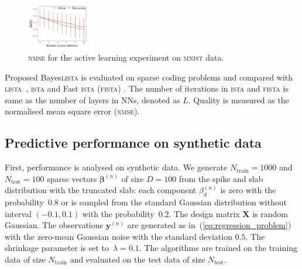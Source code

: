 \documentclass{article}
\begin{document}
    \begin{figure}[!t]
  \centering
  \includegraphics[width=0.24\textwidth]{graphics/active_mnist/nmse_validation}
  \caption{\textsc{nmse} for the active learning experiment on \textsc{mnist} data. }
  \label{fig:active_learning_mnist}
  \end{figure}

  Proposed Bayes\textsc{lista} is evaluated on sparse coding problems and compared with \textsc{lista}~\cite{gregor2010learning}, \textsc{ista} \cite{daubechies2004iterative} and Fast \textsc{ista} (\textsc{fista}) \cite{beck2009fast}. The number of iterations in \textsc{ista} and \textsc{fista} is same as the number of layers in NNs, denoted as $L$. Quality is measured as the normalised mean square error (\textsc{nmse}). %

  \subsection{Predictive performance on synthetic data}
  First, performance is analysed on synthetic data. We generate $N_\text{train}=1000$ and $N_{\text{test}} = 100$ sparse vectors $\boldsymbol\beta^{(n)}$ of size $D = 100$  from the spike and slab distribution with the truncated slab: each component $\beta^{(n)}_{d}$ is zero with the probability~$0.8$ or is sampled from the standard Gaussian distribution without interval $(-0.1, 0.1)$ with the probability~$0.2$. The design matrix $\mathbf{X}$ is random Gaussian.  The observations $\mathbf{y}^{(n)}$ are generated as in~(\ref{eq:regression_problem}) with the zero-mean Gaussian noise with the standard deviation $0.5$. The shrinkage parameter is set to~$\lambda = 0.1$. The algorithms are trained on the training data of size $N_\text{train}$ and evaluated on the test data of size $N_{\text{test}}$.
\end{document}
